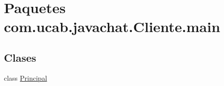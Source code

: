 \hypertarget{namespacecom_1_1ucab_1_1javachat_1_1_cliente_1_1main}{\section{Paquetes com.\-ucab.\-javachat.\-Cliente.\-main}
\label{namespacecom_1_1ucab_1_1javachat_1_1_cliente_1_1main}
}
\subsection*{Clases}
\begin{DoxyCompactItemize}
\item 
class \hyperlink{classcom_1_1ucab_1_1javachat_1_1_cliente_1_1main_1_1_principal}{Principal}
\end{DoxyCompactItemize}
